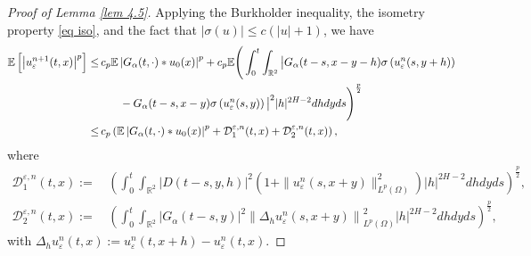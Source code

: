 \documentclass[11pt,reqno]{amsart}
\numberwithin{equation}{section}
\newcommand{\1}{{\bf 1}}
\newcommand{\2}{{\bf 2}}
\begin{document}
\begin{proof}[Proof of Lemma \ref{lem 4.5}]
Applying the Burkholder inequality,  the isometry property \eqref{eq iso}, and   the fact that  $|\sigma(u)|\le c( |u|+1)$, we have
\begin{equation}\label{eq 4.42}
\begin{split}
  \mathbb{E} \left[\left|u_{\varepsilon}^{n+1}(t,x)\right|^p\right]  
 \le &\,  c_p\mathbb{E}\left|G_{\alpha}(t,\cdot)*u_0(x)\right|^p+c_p\mathbb{E}\Bigg(\int_0^t\int_{\mathbb{R}^2}\big|G_{\alpha}(t-s,x-y-h)\sigma\left(u_{\varepsilon}^{n}(s,y+h)\right) \\
&\hskip 12pt     \,\,\, \, -G_{\alpha}(t-s,x-y)\sigma\left(u_{\varepsilon}^{n}(s,y)\right)\big|^2|h|^{2H-2}dhdyds\Bigg)^{\frac{p}2} \\
 \le &\,  c_p\left(\mathbb{E}\left|G_{\alpha}(t,\cdot)*u_0(x)\right|^p+\mathcal{D}_{1}^{\varepsilon,n}(t,x)+\mathcal{D}_{2}^{\varepsilon,n}(t,x)\right),
\end{split}
\end{equation}
where
\begin{align*}
\mathcal{D}_{1}^{\varepsilon,n}(t,x):=&\, \left(\int_0^t\int_{\mathbb{R}^2}\left|D(t-s,y,h)\right|^2\left(1+\|u_{\varepsilon}^n(s,x+y)
\|_{L^p(\Omega)}^2\right)|h|^{2H-2}dhdyds\right)^{\frac{p}2},\\
\mathcal{D}_{2}^{\varepsilon,n}(t,x):=&\, \left(\int_0^t\int_{\mathbb{R}^2}\left|G_{\alpha}(t-s,y)\right|^2\left\|\Delta_hu_{\varepsilon}^n(s,x+y)
\right\|_{L^p(\Omega)}^2|h|^{2H-2}dhdyds\right)^{\frac{p}2},
\end{align*}
with $\Delta_hu_{\varepsilon}^n(t,x):=u_{\varepsilon}^n(t,x+h)-u_{\varepsilon}^n(t,x)$.


\end{proof}
\end{document}
